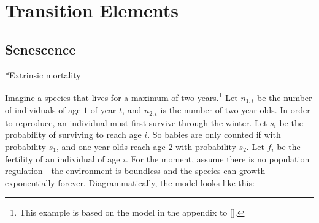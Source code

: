 \documentclass[10pt,reqno]{amsbook}
\makeatletter
\renewcommand\section{\@startsection{section}{1}
\z@{.7\linespacing\@plus\linespacing}{.5\linespacing}
{\large\bfseries\itshape}}
\numberwithin{equation}{chapter}
\makeatother
\begin{document}
\lipsum[12-14]


\part{Transition Elements}


\setcounter{chapter}{10}
\def \chapterElement {Se}
\chapter{Senescence}


\lipsum[2-4]

\section*{Extrinsic mortality}

Imagine a species that lives for a maximum of two years.\footnote{This example is based on the model in the appendix to [].} Let $n_{1,t}$ be the number of individuals of age $1$ of year $t$, and $n_{2,t}$ is the number of two-year-olds. In order to reproduce, an individual must first survive through the winter. Let $s_i$ be the probability of surviving to reach age $i$. So babies are only counted if with probability $s_1$, and one-year-olds reach age 2 with probability $s_2$. Let $f_i$ be the fertility of an individual of age $i$. For the moment, assume there is no population regulation---the environment is boundless and the species can growth exponentially forever. Diagrammatically, the model looks like this:
\end{document}
